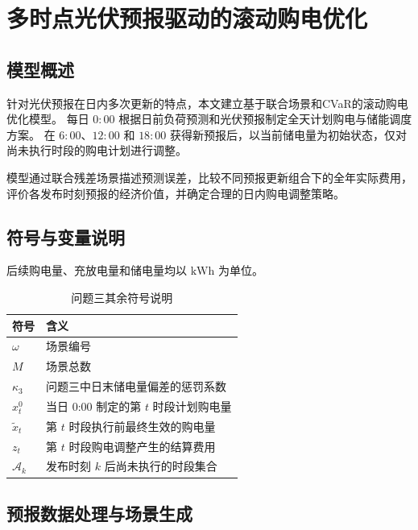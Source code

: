 \section{多时点光伏预报驱动的滚动购电优化}
\subsection{模型概述}
针对光伏预报在日内多次更新的特点，本文建立基于联合场景和CVaR的滚动购电优化模型。
每日 \(0{:}00\) 根据日前负荷预测和光伏预报制定全天计划购电与储能调度方案。
在 \(6{:}00\)、\(12{:}00\) 和 \(18{:}00\) 获得新预报后，以当前储电量为初始状态，仅对尚未执行时段的购电计划进行调整。

模型通过联合残差场景描述预测误差，比较不同预报更新组合下的全年实际费用，
评价各发布时刻预报的经济价值，并确定合理的日内购电调整策略。

\subsection{符号与变量说明}
后续购电量、充放电量和储电量均以 \(\mathrm{kWh}\) 为单位。

\begin{table}[htbp]
    \centering
    \caption{问题三其余符号说明}
    \label{tab:q3_symbols}
    \renewcommand{\arraystretch}{1.35}
    \begin{tabularx}{0.92\textwidth}{
        >{\centering\arraybackslash}p{}
        >{\centering\arraybackslash}X}
        \toprule
        符号 & 含义 \\
        \midrule
        $\omega$ & 场景编号 \\
        $M$ & 场景总数 \\
        $\kappa_3$ & 问题三中日末储电量偏差的惩罚系数 \\
        $x_t^0$ & 当日 0:00 制定的第 $t$ 时段计划购电量 \\
        $\widetilde{x}_t$ & 第 $t$ 时段执行前最终生效的购电量 \\
        $z_t$ & 第 $t$ 时段购电调整产生的结算费用 \\
        $\mathcal{A}_k$ & 发布时刻 $k$ 后尚未执行的时段集合 \\
        \bottomrule
    \end{tabularx}
\end{table}
\subsection{预报数据处理与场景生成}

